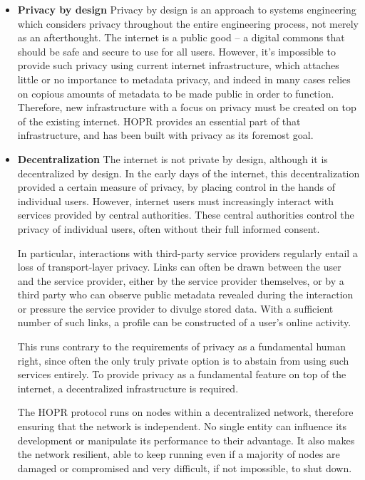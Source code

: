 \begin{itemize}

    \item \textbf{Privacy by design} Privacy by design is an approach to systems engineering which
        considers privacy throughout the entire engineering process, not merely as an afterthought. The internet is a public good –
        a digital commons that should be safe and secure to use for all users.
        However, it's impossible to provide such privacy using current
        internet infrastructure, which attaches little or no importance to metadata privacy, and indeed in many cases relies on copious amounts of metadata to be made public in order to function. Therefore, new infrastructure with a focus on privacy must be created on top of the existing internet. HOPR provides an essential part of that infrastructure, and has been built with privacy as its foremost goal.

    \item \textbf{Decentralization} The internet is not private by design, although it is decentralized by design. In the early days of the internet, this decentralization provided a certain measure of privacy, by placing control in the hands of individual users. 
        However, internet users must increasingly interact with services provided by central
        authorities. These central authorities control the privacy of individual users, often without their full informed consent. 
        
        In particular, interactions with third-party service providers regularly entail a loss of transport-layer privacy. Links can often be drawn between the user and the service provider, either by the service provider themselves, or by a third party who can observe public metadata revealed during the interaction or pressure the service provider to divulge stored data. With a sufficient number of such links, a profile can be constructed of a user's online activity. 
        
        This runs contrary to the requirements of privacy as a fundamental human right, since often the only truly private option is to abstain from using such services entirely. To provide privacy as a fundamental feature on top of the internet, a decentralized infrastructure is required.
        
        The HOPR protocol runs on nodes within a decentralized network, therefore ensuring that the network is independent. No single entity can influence its development or manipulate its performance to their advantage. It also makes the network resilient, able to keep running even if a majority of nodes are damaged or compromised and very difficult, if not impossible, to shut down.


\end{itemize}
